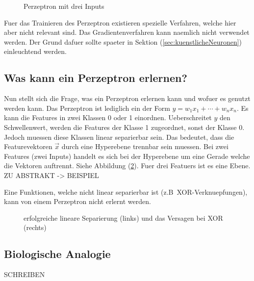 \begin{figure}[h!]
  \centering
  \caption{Perzeptron mit drei Inputs}
  \label{fi:perzeptron}
\end{figure}

Fuer das Trainieren des Perzeptron existieren spezielle Verfahren, welche hier
aber nicht relevant sind. Das Gradientenverfahren kann naemlich nicht verwendet
werden. Der Grund dafuer sollte spaeter in Sektion (\ref{sec:kuenstlicheNeuronen}) einleuchtend werden.

\subsection{Was kann ein Perzeptron erlernen?}
Nun stellt sich die Frage, was ein Perzeptron erlernen kann und wofuer es genutzt werden kann.
Das Perzeptron ist lediglich ein  der Form
$y = w_1x_1 + \cdots + w_n x_n$.
Es kann die Features in zwei Klassen 0 oder 1 einordnen.
Ueberschreitet $y$ den Schwellenwert, werden die Features der Klasse 1 zugeordnet, sonst
der Klasse 0.
Jedoch muessen diese Klassen linear separierbar sein.
Das bedeutet, dass die Featurevektoren $\vec{x}$ durch eine Hyperebene trennbar
sein muessen.
Bei zwei Features (zwei Inputs) handelt es sich bei der Hyperebene um eine
Gerade welche die Vektoren auftrennt. Siehe Abbildung (\ref{fig:linearer_Klassifikator}).
Fuer drei Featuers ist es eine Ebene.
ZU ABSTRAKT -> BEISPIEL

Eine Funktionen, welche nicht linear separierbar ist (z.B\ XOR-Verknuepfungen),
kann von einem Perzeptron nicht erlernt werden.

\begin{figure}[h!]

  \caption{erfolgreiche lineare Separierung (links) und das Versagen bei XOR (rechts)}
  \label{fig:linearer_Klassifikator}
\end{figure}

\cite{wiki:perzeptron}

\subsection{Biologische Analogie}
SCHREIBEN

